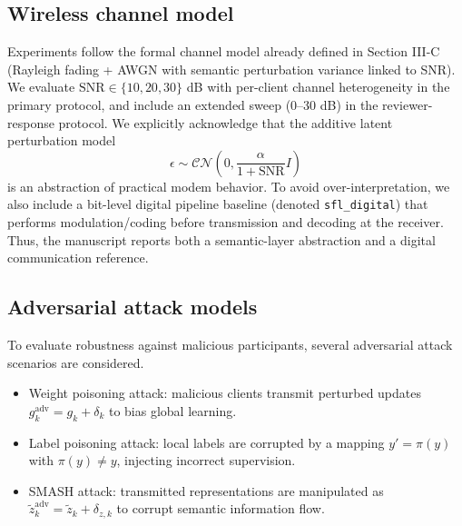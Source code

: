\documentclass[10pt,journal]{IEEEtran}
\begin{document}
\subsection{Wireless channel model}
Experiments follow the formal channel model already defined in Section III-C (Rayleigh fading + AWGN with semantic perturbation variance linked to SNR). We evaluate $\mathrm{SNR}\in\{10,20,30\}$ dB with per-client channel heterogeneity in the primary protocol, and include an extended sweep (0--30 dB) in the reviewer-response protocol.
We explicitly acknowledge that the additive latent perturbation model
\begin{equation}
\epsilon\sim\mathcal{CN}\left(0,\frac{\alpha}{1+\mathrm{SNR}}I\right)
\end{equation}
is an abstraction of practical modem behavior. To avoid over-interpretation, we also include a bit-level digital pipeline baseline (denoted \texttt{sfl\_digital}) that performs modulation/coding before transmission and decoding at the receiver. Thus, the manuscript reports both a semantic-layer abstraction and a digital communication reference.
\subsection{Adversarial attack models}
To evaluate robustness against malicious participants, several adversarial attack scenarios are considered\cite{fang2020localmodelpoisoning,bagdasaryan2020backdoor}.
\begin{itemize}
    \item Weight poisoning attack: malicious clients transmit perturbed updates $g_k^{\mathrm{adv}}=g_k+\delta_k$ to bias global learning\cite{fang2020localmodelpoisoning}.
    \item Label poisoning attack: local labels are corrupted by a mapping $y' = \pi(y)$ with $\pi(y)\neq y$, injecting incorrect supervision\cite{bagdasaryan2020backdoor}.
    \item SMASH attack: transmitted representations are manipulated as $\tilde{z}_k^{\mathrm{adv}}=\tilde{z}_k+\delta_{z,k}$ to corrupt semantic information flow\cite{10741277}.
\end{itemize}
\end{document}
